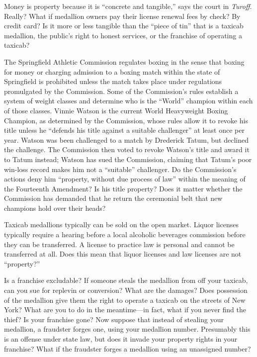 \item Money is property because it is ``concrete and tangible,'' says the court
in \textit{Turoff}. Really? What if medallion owners pay their license renewal
fees by check? By credit card? Is it more or less tangible than the ``piece of
tin'' that is a taxicab medallion, the public's right to honest services, or
the franchise of operating a taxicab?

\item The Springfield Athletic Commission regulates boxing in the sense that
boxing for money or charging admission to a boxing match within the state of
Springfield is prohibited unless the match takes place under regulations
promulgated by the Commission. Some of the Commission's rules establish a
system of weight classes and determine who is the ``World'' champion within
each of those classes. Vinnie Watson is the current World Heavyweight Boxing
Champion, as determined by the Commission, whose rules allow it to revoke his
title unless he ``defends his title against a suitable challenger'' at least
once per year. Watson was been challenged to a match by Drederick Tatum, but
declined the challenge. The Commission then voted to revoke Watson's title and
award it to Tatum instead; Watson has sued the Commission, claiming that
Tatum's poor win-loss record makes him not a ``suitable'' challenger. Do
the Commission's actions deny him ``property, without due process
of law'' within the meaning of the Fourteenth Amendment? Is his title property?
Does it matter whether the Commission has demanded that he return the
ceremonial belt that new champions hold over their heads?

\item Taxicab medallions typically can be sold on the open market. Liquor
licenses typically require a hearing before a local alcoholic beverages
commission before they can be transferred. A license to practice law is
personal and cannot be transferred at all. Does this mean that liquor licenses
and law licenses are not ``property?''

\item Is a franchise excludable? If someone steals the medallion from off your
taxicab, can you sue for replevin or conversion? What are the damages? Does
possession of the medallion give them the right to operate a taxicab on the
streets of New York? What are you to do in the meantime---in fact, what if you
never find the thief? Is your franchise gone? Now suppose that instead of
stealing your medallion, a fraudster forges one, using your medallion number.
Presumably this is an offense under state law, but does it invade your property
rights in your franchise? What if the fraudster forges a medallion using an
unassigned number? 

